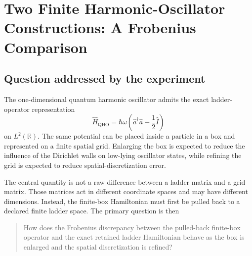 \chapter{Two Finite Harmonic-Oscillator Constructions: A Frobenius Comparison}

\label{app:harmonic-oscillator}


\section{Question addressed by the experiment}

The one-dimensional quantum harmonic oscillator admits the exact
ladder-operator representation
\begin{equation}
    \hat H_{\mathrm{QHO}}
    =
    \hbar\omega
    \left(
        \hat a^\dagger\hat a+\frac{1}{2}\hat I
    \right)
\end{equation}
on $L^2(\mathbb R)$. The same potential can be placed inside a particle in a
box and represented on a finite spatial grid. Enlarging the box is expected to
reduce the influence of the Dirichlet walls on low-lying oscillator states,
while refining the grid is expected to reduce spatial-discretization error.

The central quantity is not a raw difference between a ladder matrix and a grid
matrix. Those matrices act in different coordinate spaces and may have
different dimensions. Instead, the finite-box Hamiltonian must first be pulled
back to a declared finite ladder space. The primary question is then
\begin{quote}
How does the Frobenius discrepancy between the pulled-back finite-box operator
and the exact retained ladder Hamiltonian behave as the box is enlarged and the
spatial discretization is refined?
\end{quote}

